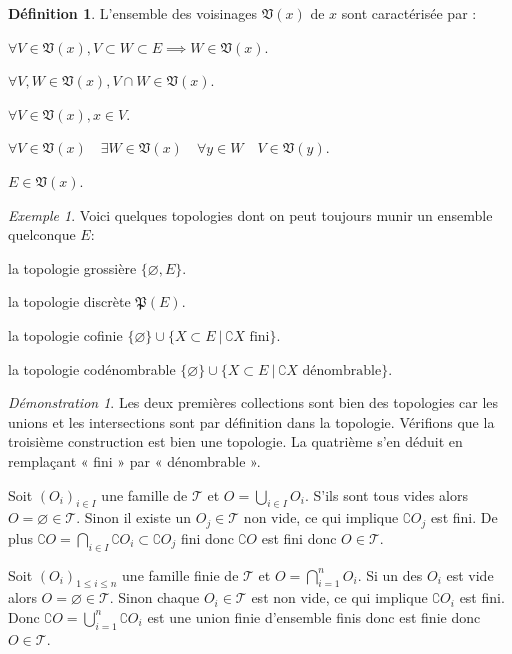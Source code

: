 \documentclass[a4paper, 11pt, french]{book}
\newenvironment{itemise}{\itemize}{\enditemize}
\theoremstyle{plain} %
\theoremstyle{definition} %
\newtheorem{definition}{Définition}
\theoremstyle{remark} %
\newtheorem{exemple}{Exemple}
\newtheorem*{demonstration}{Démonstration}
\newcommand{\1}{\mathds{1}}
\newcommand\vide{\varnothing}
\renewcommand{\frak}[1]{\mathfrak{#1}}
\newcommand{\scr}[1]{\mathscr{#1}}
\newcommand\ens[2]{\{#1 \ |\ #2\}}
\begin{document}
\begin{definition}
	L'ensemble des voisinages $\frak{V}(x)$ de $x$ sont caractérisée par : 
	\begin{itemise}
		\item $\forall V\in\frak{V}(x), V\subset W\subset E\implies W\in\frak{V}(x)$.
		\item $\forall V, W\in\frak{V}(x), V\cap W\in\frak{V}(x)$.
		\item $\forall V\in\frak{V}(x), x\in V$.
		\item $\forall V\in\frak{V}(x)\quad\exists W\in\frak{V}(x)\quad\forall y\in W\quad V\in\frak{V}(y)$.
		\item $E\in\frak{V}(x)$.
	\end{itemise}
\end{definition}

\begin{exemple}
	Voici quelques topologies dont on peut toujours munir un ensemble quelconque $E$:
	\begin{itemise}
		\item la topologie grossière $\{\vide, E\}$.
		\item la topologie discrète $\frak{P}(E)$.
		\item la topologie cofinie $\{\vide\}\cup\ens{X\subset E}{\text{$\complement X$ fini}}$.
		\item la topologie codénombrable $\{\vide\}\cup\ens{X\subset E}{\complement X\text{ dénombrable}}$.
	\end{itemise}
\end{exemple}

\begin{demonstration}
	Les deux premières collections sont bien des topologies car les unions et les intersections sont par définition dans la topologie.
	Vérifions que la troisième construction est bien une topologie.
	La quatrième s'en déduit en remplaçant « fini » par « dénombrable ».
	\begin{itemise}
		\item Soit $(O_i)_{i\in I}$ une famille de $\scr{T}$ et $O=\bigcup_{i\in I}O_i$.
		S'ils sont tous vides alors $O=\vide\in\scr{T}$.
		Sinon il existe un $O_j\in\scr{T}$ non vide, ce qui implique $\complement O_j$ est fini.
		De plus $\complement O=\bigcap_{i\in I}\complement O_i\subset\complement O_j$ fini donc $\complement O$ est fini donc $O\in\scr{T}$.
		\item Soit $(O_i)_{1\leqslant i\leqslant n}$ une famille finie de $\scr{T}$ et $O=\bigcap_{i=1}^nO_i$.
		Si un des $O_i$ est vide alors $O=\vide\in\scr{T}$.
		Sinon chaque $O_i\in\scr{T}$ est non vide, ce qui implique $\complement O_i$ est fini.
		Donc $\complement O=\bigcup_{i=1}^n\complement O_i$ est une union finie d'ensemble finis donc est finie donc $O\in\scr{T}$.
	\end{itemise}
\end{demonstration}
\end{document}
